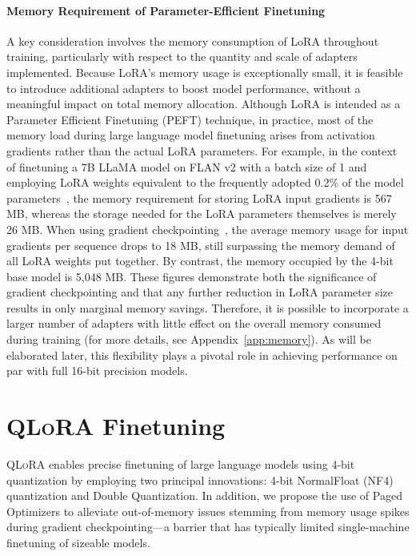 \paragraph{Memory Requirement of Parameter-Efficient Finetuning} A key consideration involves the memory consumption of LoRA throughout training, particularly with respect to the quantity and scale of adapters implemented. Because LoRA’s memory usage is exceptionally small, it is feasible to introduce additional adapters to boost model performance, without a meaningful impact on total memory allocation. Although LoRA is intended as a Parameter Efficient Finetuning (PEFT) technique, in practice, most of the memory load during large language model finetuning arises from activation gradients rather than the actual LoRA parameters. For example, in the context of finetuning a 7B LLaMA model on FLAN v2 with a batch size of 1 and employing LoRA weights equivalent to the frequently adopted 0.2\% of the model parameters~\citep{hu2021lora,liu2022few}, the memory requirement for storing LoRA input gradients is 567 MB, whereas the storage needed for the LoRA parameters themselves is merely 26 MB. When using gradient checkpointing~\citep{chen2016training}, the average memory usage for input gradients per sequence drops to 18 MB, still surpassing the memory demand of all LoRA weights put together. By contrast, the memory occupied by the 4-bit base model is 5,048 MB. These figures demonstrate both the significance of gradient checkpointing and that any further reduction in LoRA parameter size results in only marginal memory savings. Therefore, it is possible to incorporate a larger number of adapters with little effect on the overall memory consumed during training (for more details, see Appendix~\ref{app:memory}). As will be elaborated later, this flexibility plays a pivotal role in achieving performance on par with full 16-bit precision models.

\section{\textsc{QLoRA} Finetuning}

\textsc{QLoRA} enables precise finetuning of large language models using 4-bit quantization by employing two principal innovations: 4-bit NormalFloat (NF4) quantization and Double Quantization. In addition, we propose the use of Paged Optimizers to alleviate out-of-memory issues stemming from memory usage spikes during gradient checkpointing—a barrier that has typically limited single-machine finetuning of sizeable models.

